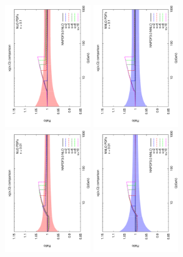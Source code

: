 \documentclass[letter,11pt]{article}
\begin{document}
%
\begin{figure}[t]
\centering
\includegraphics[width=0.33\textwidth,angle=-90]{./gluon_ratio_kb_nlo_x_01.pdf}
\includegraphics[width=0.33\textwidth,angle=-90]{./gluon_ratio_kb_nnlo_x_01.pdf}
\includegraphics[width=0.33\textwidth,angle=-90]{./gluon_ratio_kb_nlo_x_001.pdf}
\includegraphics[width=0.33\textwidth,angle=-90]{./gluon_ratio_kb_nnlo_x_001.pdf}

\end{figure}
\end{document}
